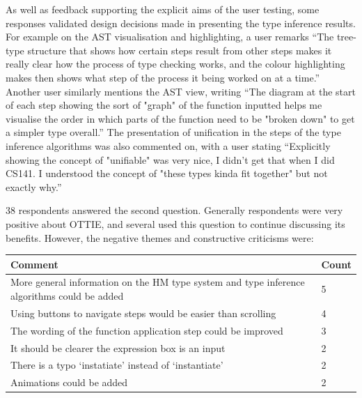 \documentclass[a4paper,fleqn,oneside,12pt]{report}
\begin{document}
As well as feedback supporting the explicit aims of the user testing, some responses validated design decisions made in presenting the type inference results. For example on the AST visualisation and highlighting, a user remarks “The tree-type structure that shows how certain steps result from other steps makes it really clear how the process of type checking works, and the colour highlighting makes then shows what step of the process it being worked on at a time.” Another user similarly mentions the AST view, writing “The diagram at the start of each step showing the sort of "graph" of the function inputted helps me visualise the order in which parts of the function need to be "broken down" to get a simpler type overall.” The presentation of unification in the steps of the type inference algorithms was also commented on, with a user stating “Explicitly showing the concept of "unifiable" was very nice, I didn't get that when I did CS141. I understood the concept of "these types kinda fit together" but not exactly why.”

38 respondents answered the second question. Generally respondents were very positive about OTTIE, and several used this question to continue discussing its benefits. However, the negative themes and constructive criticisms were:

\vspace{0.2cm}
\begin{adjustbox}{center}
  \begin{tabularx}{\textwidth}{ |X|p{1.5cm}| }
    \hline
    \textbf{Comment} & \textbf{Count} \\
    \hline
    More general information on the HM type system and type inference algorithms could be added & 5 \\
    \hline
    Using buttons to navigate steps would be easier than scrolling & 4 \\
    \hline
    The wording of the function application step could be improved & 3 \\
    \hline
    It should be clearer the expression box is an input & 2 \\
    \hline
    There is a typo `instatiate' instead of `instantiate' & 2 \\
    \hline
    Animations could be added & 2 \\
    \hline
\end{tabularx}
\end{adjustbox}\\
\end{document}
